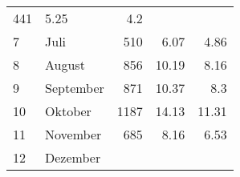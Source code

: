 \begin{longtable}{lXrrr}
       \num{441} &
       \num[round-mode=places,round-precision=2]{5,25} &
         \num[round-mode=places,round-precision=2]{4,2} \\

     7 &
     \multicolumn{1}{X}{ Juli   } &


       \num{510} &
       \num[round-mode=places,round-precision=2]{6,07} &
         \num[round-mode=places,round-precision=2]{4,86} \\

     8 &
     \multicolumn{1}{X}{ August   } &


       \num{856} &
       \num[round-mode=places,round-precision=2]{10,19} &
         \num[round-mode=places,round-precision=2]{8,16} \\

     9 &
     \multicolumn{1}{X}{ September   } &


       \num{871} &
       \num[round-mode=places,round-precision=2]{10,37} &
         \num[round-mode=places,round-precision=2]{8,3} \\

     10 &
     \multicolumn{1}{X}{ Oktober   } &


       \num{1187} &
       \num[round-mode=places,round-precision=2]{14,13} &
         \num[round-mode=places,round-precision=2]{11,31} \\

     11 &
     \multicolumn{1}{X}{ November   } &


       \num{685} &
       \num[round-mode=places,round-precision=2]{8,16} &
         \num[round-mode=places,round-precision=2]{6,53} \\

     12 &
     \multicolumn{1}{X}{ Dezember   } &



\end{longtable}
